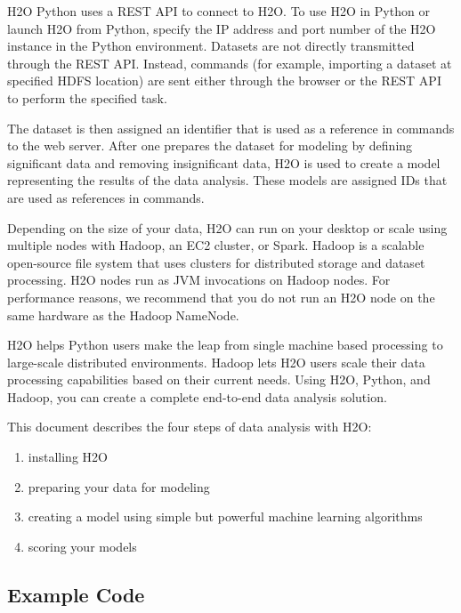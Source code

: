 H2O Python uses a REST API to connect to H2O. To use H2O in Python or launch H2O from Python, specify the IP address and port number of the H2O instance in the Python environment. Datasets are not directly transmitted
through the REST API. Instead, commands (for example, importing a dataset at specified HDFS location) are sent either through the browser or the REST API to perform the specified task.

The dataset is then assigned an identifier that is used as a reference in  commands to the web server.
After one prepares the dataset for modeling by defining significant data and removing insignificant data,
H2O is used to create a model representing the results of the data analysis.
These models are assigned IDs that are used as references in commands.

Depending on the size of your data,  H2O can run on your desktop or scale using multiple nodes with Hadoop,
an EC2 cluster, or Spark.  Hadoop is a scalable open-source file
system that uses clusters for distributed storage and dataset processing. H2O nodes run as JVM invocations on Hadoop
nodes. For performance reasons, we recommend that you do not run an H2O node on the same hardware as the Hadoop
NameNode.

H2O helps Python users make the leap from single machine based processing to large-scale distributed environments.
Hadoop lets H2O users scale their data processing capabilities based on their current needs.
Using H2O, Python, and Hadoop, you can create a complete end-to-end data analysis solution.

This document describes the four steps of data analysis with H2O:
\begin{enumerate}

\item installing H2O
\item preparing your data for modeling
\item creating a model using simple but powerful machine learning algorithms
\item scoring your models

\end{enumerate}

\newpage


\subsection{Example Code}

